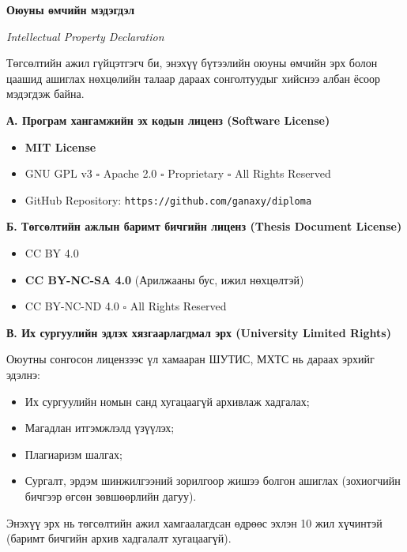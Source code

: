 
\cleardoublepage
\thispagestyle{plain}

\begin{center}
{\huge\textbf{Оюуны өмчийн мэдэгдэл}\par}
\smallskip
{\large\textit{Intellectual Property Declaration}\par}
\end{center}
\bigskip

\noindent Төгсөлтийн ажил гүйцэтгэгч \textbf{\shortname} би, энэхүү бүтээлийн
оюуны өмчийн эрх болон цаашид ашиглах нөхцөлийн талаар дараах сонголтуудыг
хийснээ албан ёсоор мэдэгдэж байна.

\bigskip
\noindent\textbf{А. Програм хангамжийн эх кодын лиценз (Software License)}
\begin{itemize}
  \item[$\boxtimes$] \textbf{MIT License}
  \item[$\square$] GNU GPL v3 \qquad $\square$ Apache 2.0 \qquad
        $\square$ Proprietary \qquad $\square$ All Rights Reserved
  \item GitHub Repository: \texttt{https://github.com/ganaxy/diploma}
\end{itemize}

\medskip
\noindent\textbf{Б. Төгсөлтийн ажлын баримт бичгийн лиценз (Thesis Document License)}
\begin{itemize}
  \item[$\square$] CC BY 4.0
  \item[$\boxtimes$] \textbf{CC BY-NC-SA 4.0} (Арилжааны бус, ижил нөхцөлтэй)
  \item[$\square$] CC BY-NC-ND 4.0 \qquad $\square$ All Rights Reserved
\end{itemize}

\medskip
\noindent\textbf{В. Их сургуулийн эдлэх хязгаарлагдмал эрх (University Limited Rights)}

\noindent Оюутны сонгосон лицензээс үл хамааран ШУТИС, МХТС нь дараах эрхийг эдэлнэ:
\begin{itemize}
  \item Их сургуулийн номын санд хугацаагүй архивлаж хадгалах;
  \item Магадлан итгэмжлэлд үзүүлэх;
  \item Плагиаризм шалгах;
  \item Сургалт, эрдэм шинжилгээний зорилгоор жишээ болгон ашиглах
        (зохиогчийн бичгээр өгсөн зөвшөөрлийн дагуу).
\end{itemize}
\noindent Энэхүү эрх нь төгсөлтийн ажил хамгаалагдсан өдрөөс эхлэн 10 жил
хүчинтэй (баримт бичгийн архив хадгалалт хугацаагүй).

